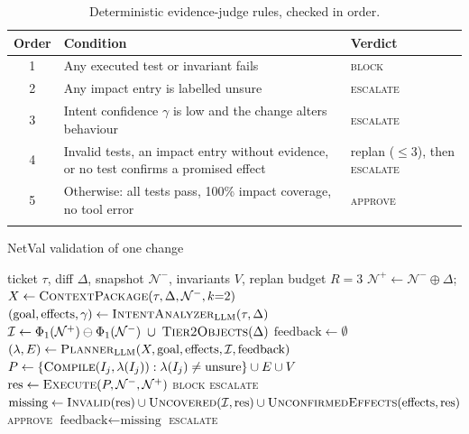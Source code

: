 \documentclass[pdflatex,iicol,sn-mathphys-num]{sn-jnl}%
\theoremstyle{thmstyletwo}%
\begin{document}
\begin{table}[t]
\caption{Deterministic evidence-judge rules, checked in order.}\label{tab:judge}
\centering\footnotesize
\begin{tabular}{@{}cL{42mm}L{20mm}@{}}
\toprule
Order & Condition & Verdict\\
 & Any executed test or invariant fails & \textsc{block}\\
2 & Any impact entry is labelled unsure & \textsc{escalate}\\
3 & Intent confidence $\gamma$ is low and the change alters behaviour & \textsc{escalate}\\
4 & Invalid tests, an impact entry without evidence, or no test confirms a promised effect & replan ($\le$3), then \textsc{escalate}\\
5 & Otherwise: all tests pass, 100\% impact coverage, no tool error & \textsc{approve}\\
\botrule
\end{tabular}
\end{table}

\begin{algorithm*}[t]
\caption{NetVal validation of one change}\label{alg:netval}
\footnotesize
\begin{algorithmic}[1]
\Require ticket $\tau$, diff $\Delta$, snapshot $\mathcal{N}^{-}$, invariants $V$, replan budget $R=3$
\State $\mathcal{N}^{+}\gets\mathcal{N}^{-}\oplus\Delta$; $X\gets\textsc{ContextPackage}(\tau,\Delta,\mathcal{N}^{-},k{=}2)$
\State $(\text{goal},\text{effects},\gamma)\gets\textsc{IntentAnalyzer}_{\mathrm{LLM}}(\tau,\Delta)$
\State $\mathcal{I}\gets\Phi_1(\mathcal{N}^{+})\ominus\Phi_1(\mathcal{N}^{-})\;\cup\;\textsc{Tier2Objects}(\Delta)$ 
\State $\text{feedback}\gets\emptyset$
  \State $(\lambda,E)\gets\textsc{Planner}_{\mathrm{LLM}}(X,\text{goal},\text{effects},\mathcal{I},\text{feedback})$
  \State $P\gets\{\textsc{Compile}(I_j,\lambda(I_j)) : \lambda(I_j)\neq\text{unsure}\}\cup E\cup V$
  \State $\text{res}\gets\textsc{Execute}(P,\mathcal{N}^{-},\mathcal{N}^{+})$ 
   \Return \textsc{block} \EndIf
   \Return \textsc{escalate} \EndIf
  \State $\text{missing}\gets\textsc{Invalid}(\text{res})\cup\textsc{Uncovered}(\mathcal{I},\text{res})\cup\textsc{UnconfirmedEffects}(\text{effects},\text{res})$
   \Return \textsc{approve} \EndIf
  \State $\text{feedback}\gets\text{missing}$
\EndFor
\State \Return \textsc{escalate}
\end{algorithmic}
\end{algorithm*}
\end{document}
